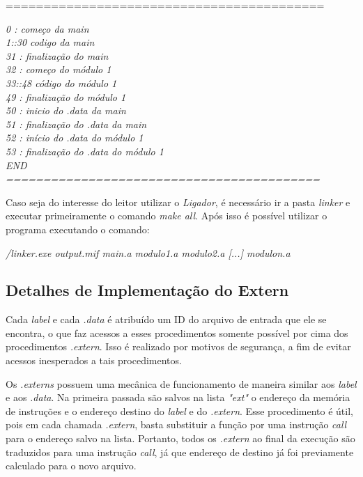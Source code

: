 \documentclass{article}
\begin{document}
\noindent==========================================

\noindent\textit{0 : começo da main\\
1::30 codigo da main\\
31 : finalização do main\\
32 : começo do módulo 1\\
33::48 código do módulo 1\\
49 : finalização do módulo 1\\
50 : inicio do .data da main\\
51 : finalização do .data da main\\
52 : início do .data do módulo 1\\
53 : finalização do .data do módulo 1\\
END\\
==========================================}

Caso seja do interesse do leitor utilizar o \textit{Ligador}, é necessário ir a pasta \textit{linker} e executar primeiramente o comando \textit{make all}. Após isso é possível utilizar o programa executando o comando:

\begin{center} \textit{/linker.exe output.mif main.a modulo1.a modulo2.a [...] modulon.a} \end{center}

\subsection{Detalhes de Implementação do Extern}

Cada \textit{label} e cada \textit{.data} é atribuído um ID do arquivo de entrada que ele se encontra, o que faz acessos a esses procedimentos somente possível por cima dos procedimentos \textit{.extern}. Isso é realizado por motivos de segurança, a fim de evitar acessos inesperados a tais procedimentos.

Os \textit{.externs} possuem uma mecânica de funcionamento de maneira similar aos \textit{label} e aos \textit{.data}. Na primeira passada são salvos na lista \textit{"ext"} o endereço da memória de instruções e o endereço destino do \textit{label} e do \textit{.extern}. Esse procedimento é útil, pois em cada chamada \textit{.extern}, basta substituir a função por uma instrução \textit{call} para o endereço salvo na lista. Portanto, todos os \textit{.extern} ao final da execução são traduzidos para uma instrução \textit{call}, já que endereço de destino já foi previamente calculado para o novo arquivo.
\end{document}
